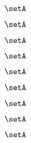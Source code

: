 \begin{forslides}
    \begin{equation}
        \label{eq:combination-181}
        \setA
    \end{equation}

    \begin{equation}
        \label{eq:combination-182}
        \setA
    \end{equation}

    \begin{equation}
        \label{eq:combination-183}
        \setA
    \end{equation}

    \begin{equation}
        \label{eq:combination-184}
        \setA
    \end{equation}

    \begin{equation}
        \label{eq:combination-185}
        \setA
    \end{equation}

    \begin{equation}
        \label{eq:combination-186}
        \setA
    \end{equation}

    \begin{equation}
        \label{eq:combination-187}
        \setA
    \end{equation}

    \begin{equation}
        \label{eq:combination-188}
        \setA
    \end{equation}

    \begin{equation}
        \label{eq:combination-189}
        \setA
    \end{equation}

\end{forslides}